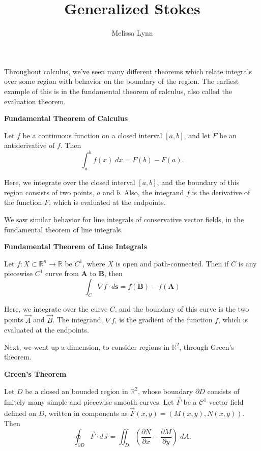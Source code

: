 \documentclass{ximera}
\title{Generalized Stokes}
\author{Melissa Lynn}
\begin{document}
  
\begin{abstract}  
\end{abstract}  
\maketitle 

Throughout calculus, we've seen many different theorems which relate integrals over some region with behavior on the boundary of the region. The earliest example of this is in the fundamental theorem of calculus, also called the evaluation theorem.

\begin{theorem}
\textbf{Fundamental Theorem of Calculus}

Let $f$ be a continuous function on a closed interval $[a,b]$, and let $F$ be an antiderivative of $f$. Then
\[
\int_a^b f(x)\;dx = F(b) - F(a).
\]
\end{theorem}

Here, we integrate over the closed interval $[a,b]$, and the boundary of this region consists of two points, $a$ and $b$. Also, the integrand $f$ is the derivative of the function $F$, which is evaluated at the endpoints.

We saw similar behavior for line integrals of conservative vector fields, in the fundamental theorem of line integrals.

\begin{theorem}
\textbf{Fundamental Theorem of Line Integrals}

Let $f:X\subset \mathbb{R}^n\rightarrow \mathbb{R}$ be $C^1$, where $X$ is open and path-connected. Then if $C$ is any piecewise $C^1$ curve from $\textbf{A}$ to $\textbf{B}$, then
\[
\int_C\nabla f\cdot d\textbf{s} = f(\textbf{B})-f(\textbf{A})
\]
\end{theorem}

Here, we integrate over the curve $C$, and the boundary of this curve is the two points $\vec{A}$ and $\vec{B}$. The integrand, $\nabla f$, is the gradient of the function $f$, which is evaluated at the endpoints.

Next, we went up a dimension, to consider regions in $\mathbb{R}^2$, through Green's theorem.

\begin{theorem}
\textbf{Green's Theorem}

Let $D$ be a closed an bounded region in $\mathbb{R}^2$, whose boundary $\partial D$ consists of finitely many simple and piecewise smooth curves. Let $\vec{F}$ be a $\mathcal{C}^1$ vector field defined on $D$, written in components as $\vec{F}(x,y) = (M(x,y), N(x,y))$. Then
\[
\oint_{\partial D}\vec{F}\cdot d\vec{s} = \iint_D \left(\frac{\partial N}{\partial x} - \frac{\partial M}{\partial y}\right)\;dA.
\]
\end{theorem}
\end{document}
